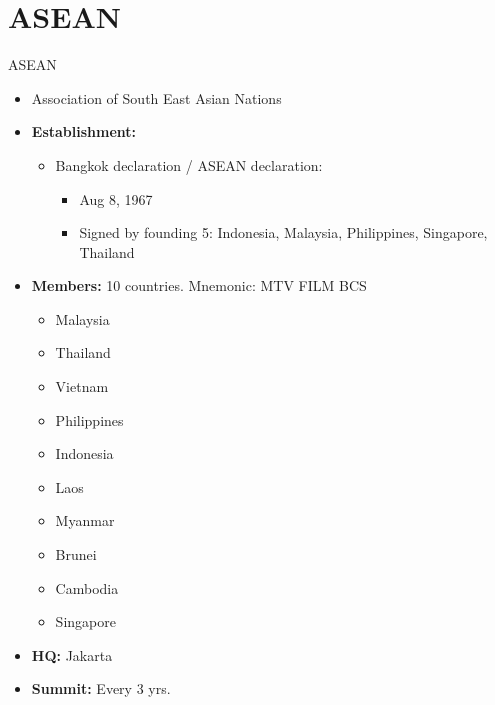 \documentclass[
  12pt,
  ignorenonframetext,
  progressbar=frametitle]{beamer}
\providecommand{\tightlist}{%
  \setlength{\itemsep}{0pt}\setlength{\parskip}{0pt}}
\begin{document}
\section{ASEAN}
\begin{frame}[allowframebreaks]
{ASEAN}
\protect\hypertarget{asean}{}
\begin{itemize}
\tightlist
\item
  Association of South East Asian Nations
\item
  \textbf{Establishment:}

  \begin{itemize}
  \tightlist
  \item
    Bangkok declaration / ASEAN declaration:

    \begin{itemize}
    \tightlist
    \item
      Aug 8, 1967
    \item
      Signed by founding 5: Indonesia, Malaysia, Philippines, Singapore,
      Thailand
    \end{itemize}
  \end{itemize}
\item
  \textbf{Members:} 10 countries. Mnemonic: MTV  FILM
   BCS 

  \begin{itemize}
  \tightlist
  \item
    Malaysia
  \item
    Thailand
  \item
    Vietnam
  \item
    Philippines
  \item
    Indonesia
  \item
    Laos
  \item
    Myanmar
  \item
    Brunei
  \item
    Cambodia
  \item
    Singapore
  \end{itemize}
\item
  \textbf{HQ:} Jakarta
\item
  \textbf{Summit:} Every 3 yrs.
\end{itemize}
\end{frame}
\end{document}
